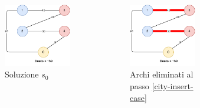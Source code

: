 \documentclass[9pt]{beamer}
\begin{document}
\begin{frame}{\subsecname}
{      \begin{columns}[T,onlytextwidth]
		\begin{figure}[h]
		\centering
		\includegraphics[height=0.25\textheight]
		{../images/graph-greedy-request-order-solution-tsppd-with-two-customers}	
		\caption{Soluzione $s_0$}
		\end{figure}
		\begin{figure}[h]
		\centering
		\includegraphics[height=0.25\textheight]
		{../images/city-insert}	
		\caption{Archi eliminati al passo \ref{city-insert-case}}
		\end{figure}
		\begin{figure}[h]
		\centering

\end{figure}
\end{columns}}
\end{frame}
\end{document}
